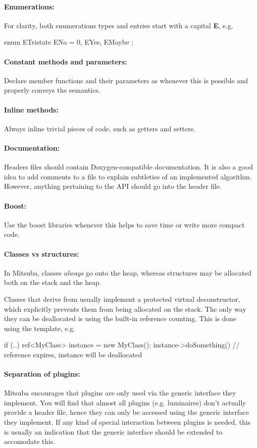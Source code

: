 \paragraph{Enumerations:} For clarity, both enumerations types and entries
start with a capital \textbf{E}, e.g.
\begin{cpp}
enum ETristate {
	ENo = 0,
	EYes,
	EMaybe
};
\end{cpp}
\paragraph{Constant methods and parameters:} Declare member functions and
their parameters as  whenever this is possible
and properly conveys the semantics.
\paragraph{Inline methods:} Always inline trivial pieces of code, such
as getters and setters.
\paragraph{Documentation:} Headers files should contain
Doxygen-compatible documentation. It is also a good idea to add
comments to a  file to explain subtleties of an implemented algorithm. 
However, anything pertaining to the API should go into the header file.

\paragraph{Boost:} Use the boost libraries whenever this helps to save
time or write more compact code.

\paragraph{Classes vs structures:}In Mitsuba, classes \emph{always} go onto the heap,
whereas structures may be allocated both on the stack and the heap. 

Classes that derive from  usually implement a protected virtual
deconstructor, which explicitly prevents them from being allocated on the stack.
The only way they can be deallocated is using the built-in reference
counting. This is done using the  template, e.g.

\begin{cpp}
if (..) {
	ref<MyClass> instance = new MyClass();
	instance->doSomething()
}   // reference expires, instance will be deallocated
\end{cpp}

\paragraph{Separation of plugins:}Mitsuba encourages that plugins are only
used via the generic interface they implement. You will find that almost all plugins
(e.g. luminaires) don't actually provide a header file, hence they can only be accessed
using the generic  interface they implement. If any kind of special 
interaction between plugins is needed, this is usually an indication that the 
generic interface should be extended to accomodate this.
